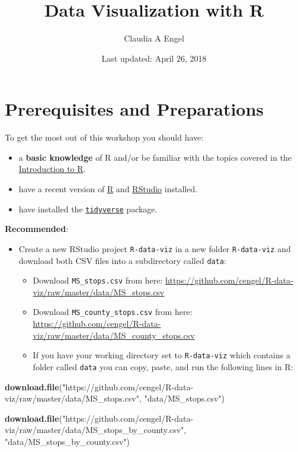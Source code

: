 \documentclass[]{book}
\title{Data Visualization with R}
\author{Claudia A Engel}
\date{Last updated: April 26, 2018}
\newenvironment{Shaded}{\begin{snugshade}}{\end{snugshade}}
\newcommand{\KeywordTok}[1]{\textcolor[rgb]{0.13,0.29,0.53}{\textbf{#1}}}
\newcommand{\StringTok}[1]{\textcolor[rgb]{0.31,0.60,0.02}{#1}}
\newcommand{\NormalTok}[1]{#1}
\providecommand{\tightlist}{%
  \setlength{\itemsep}{0pt}\setlength{\parskip}{0pt}}
\theoremstyle{definition}
\theoremstyle{definition}
\theoremstyle{definition}
\theoremstyle{remark}
\begin{document}
\maketitle

{
\setcounter{tocdepth}{1}
\tableofcontents
}
\chapter*{Prerequisites and
Preparations}\label{prerequisites-and-preparations}

To get the most out of this workshop you should have:

\begin{itemize}
\tightlist
\item
  a \textbf{basic knowledge} of R and/or be familiar with the topics
  covered in the \href{https://cengel.github.io/R-intro/}{Introduction
  to R}.
\item
  have a recent version of \href{https://cran.r-project.org/}{R} and
  \href{https://www.rstudio.com/}{RStudio} installed.
\item
  have installed the \href{http://tidyverse.org/}{\texttt{tidyverse}}
  package.
\end{itemize}

\textbf{Recommended}:

\begin{itemize}
\tightlist
\item
  Create a new RStudio project \texttt{R-data-viz} in a new folder
  \texttt{R-data-viz} and download both CSV files into a subdirectory
  called \texttt{data}:

  \begin{itemize}
  \tightlist
  \item
    Download \texttt{MS\_stops.csv} from here:
    \url{https://github.com/cengel/R-data-viz/raw/master/data/MS_stops.csv}
  \item
    Download \texttt{MS\_county\_stops.csv} from here:
    \url{https://github.com/cengel/R-data-viz/raw/master/data/MS_county_stops.csv}
  \item
    If you have your working directory set to \texttt{R-data-viz} which
    contains a folder called \texttt{data} you can copy, paste, and run
    the following lines in R:
  \end{itemize}
\end{itemize}

\begin{Shaded}
\begin{Highlighting}[]
\KeywordTok{download.file}\NormalTok{(}\StringTok{"https://github.com/cengel/R-data-viz/raw/master/data/MS_stops.csv"}\NormalTok{, }
              \StringTok{"data/MS_stops.csv"}\NormalTok{)}

\KeywordTok{download.file}\NormalTok{(}\StringTok{"https://github.com/cengel/R-data-viz/raw/master/data/MS_stops_by_county.csv"}\NormalTok{, }
              \StringTok{"data/MS_stops_by_county.csv"}\NormalTok{)}
\end{Highlighting}
\end{Shaded}
\end{document}
